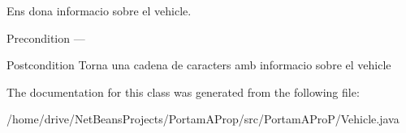 Ens dona informacio sobre el vehicle. 

\begin{DoxyPrecond}{Precondition}
--- 
\end{DoxyPrecond}
\begin{DoxyPostcond}{Postcondition}
Torna una cadena de caracters amb informacio sobre el vehicle 
\end{DoxyPostcond}


The documentation for this class was generated from the following file\+:\begin{DoxyCompactItemize}
\item 
/home/drive/\+Net\+Beans\+Projects/\+Portam\+A\+Prop/src/\+Portam\+A\+Pro\+P/Vehicle.\+java\end{DoxyCompactItemize}
